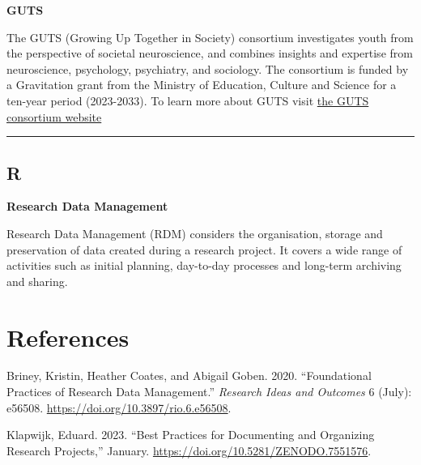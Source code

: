\documentclass[
  letterpaper,
  DIV=11,
  numbers=noendperiod]{scrreprt}
\newlength{\cslhangindent}
\newenvironment{CSLReferences}[2] %
 {\begin{list}{}{%
  \setlength{\itemindent}{0pt}
  \setlength{\leftmargin}{0pt}
  \setlength{\parsep}{0pt}
  \ifodd #1
   \setlength{\leftmargin}{\cslhangindent}
   \setlength{\itemindent}{-1\cslhangindent}
  \fi
  \setlength{\itemsep}{#2\baselineskip}}}
 {\end{list}}
\begin{document}

\textbf{GUTS}

The GUTS (Growing Up Together in Society) consortium investigates youth
from the perspective of societal neuroscience, and combines insights and
expertise from neuroscience, psychology, psychiatry, and sociology. The
consortium is funded by a Gravitation grant from the Ministry of
Education, Culture and Science for a ten-year period (2023-2033). To
learn more about GUTS visit
\href{https://growinguptogetherinsociety.com/}{the GUTS consortium
website}

\begin{center}\rule{0.5\linewidth}{0.5pt}\end{center}

\section*{R}\label{sec-r}


\textbf{Research Data Management}

Research Data Management (RDM) considers the organisation, storage and
preservation of data created during a research project. It covers a wide
range of activities such as initial planning, day-to-day processes and
long-term archiving and sharing.


\chapter*{References}\label{references}


\label{refs}
\begin{CSLReferences}{1}{0}
Briney, Kristin, Heather Coates, and Abigail Goben. 2020.
{``Foundational Practices of Research Data Management.''} \emph{Research
Ideas and Outcomes} 6 (July): e56508.
\url{https://doi.org/10.3897/rio.6.e56508}.

Klapwijk, Eduard. 2023. {``Best Practices for Documenting and Organizing
Research Projects,''} January.
\url{https://doi.org/10.5281/ZENODO.7551576}.

\end{CSLReferences}
\end{document}
